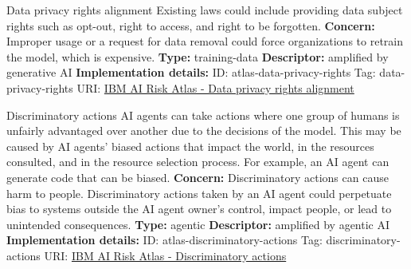 \documentclass[a4paper,12pt]{article}
\begin{document}
\begin{definitionbox}{Data privacy rights alignment}
Existing laws could include providing data subject rights such as opt-out, right to access, and right to be forgotten.\newline\newline
\textbf{Concern: }Improper usage or a request for data removal could force organizations to retrain the model, which is expensive.\newline\newline
\textbf{Type: }training-data\newline
\textbf{Descriptor: }amplified by generative AI \newline\newline
\textbf{Implementation details: } \newline
ID: atlas-data-privacy-rights \newline
Tag: data-privacy-rights \newline
URI:  \href{https://www.ibm.com/docs/en/watsonx/saas?topic=SSYOK8/wsj/ai-risk-atlas/data-privacy-rights.html}{IBM AI Risk Atlas - Data privacy rights alignment}\newline
\end{definitionbox}
\begin{definitionbox}{Discriminatory actions}
AI agents can take actions where one group of humans is unfairly advantaged over another due to the decisions of the model. This may be caused by AI agents' biased actions that impact the world, in the resources consulted, and in the resource selection process. For example, an AI agent can generate code that can be biased.\newline\newline
\textbf{Concern: }Discriminatory actions can cause harm to people. Discriminatory actions taken by an AI agent could perpetuate bias to systems outside the AI agent owner's control,  impact people, or lead to unintended consequences.\newline\newline
\textbf{Type: }agentic\newline
\textbf{Descriptor: }amplified by agentic AI \newline\newline
\textbf{Implementation details: } \newline
ID: atlas-discriminatory-actions \newline
Tag: discriminatory-actions \newline
URI:  \href{https://www.ibm.com/docs/en/watsonx/saas?topic=SSYOK8/wsj/ai-risk-atlas/discriminatory-actions.html}{IBM AI Risk Atlas - Discriminatory actions}\newline
\end{definitionbox}
\end{document}
